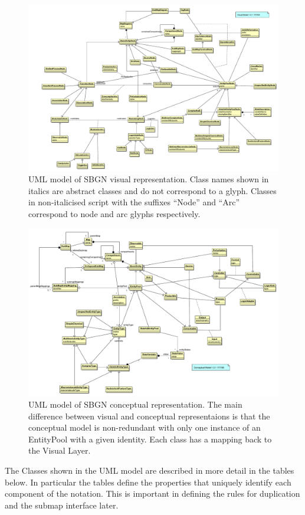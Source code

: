  \begin{landscape}
\begin{figure}[p]
\begin{center}
\includegraphics[width=0.85\linewidth]{images/sbgn_visual}
\caption{UML model of SBGN visual representation. Class names shown in italics are abstract classes and do not correspond to a glyph. Classes in non-italicised script with the suffixes ``Node'' and ``Arc'' correspond to node and arc glyphs respectively.}
\label{fig:sbgn_visual}
\end{center}
\end{figure}

\begin{figure}[p]
\begin{center}
\includegraphics[width=0.85\linewidth]{images/sbgn_conceptual}
\caption{UML model of SBGN conceptual representation. The main difference between visual and conceptual representaions is that the conceptual model is non-redundant with only one instance of an EntityPool with a given identity. Each class has a mapping back to the Visual Layer.}
\label{fig:sbgn_conceptual}
\end{center}
\end{figure}
\end{landscape}
The Classes shown in the UML model are described in more detail in the
tables below. In particular the tables define the properties that
uniquely identify each component of the notation. This is important in
defining the rules for duplication and the submap interface later.

